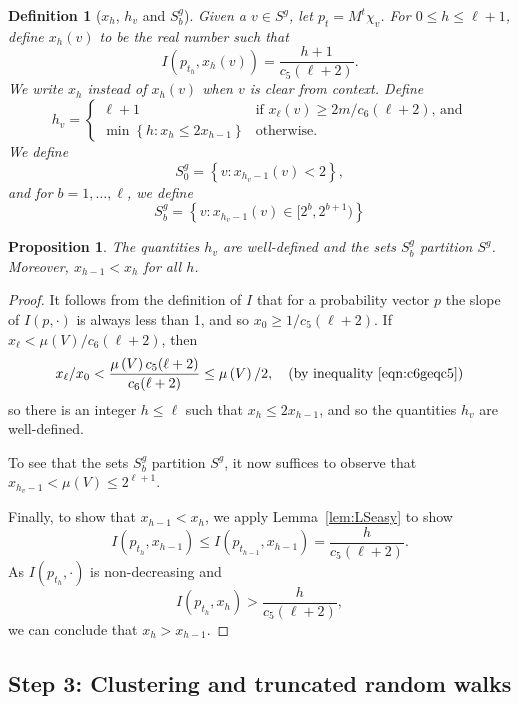 \documentclass[11pt]{article}
\newtheorem{proposition}[theorem]{Proposition}
\newtheorem{definition}[theorem]{Definition}
\def\setof#1{\left\{#1  \right\}}
\def\setof#1{\left\{#1  \right\}}
\def\vol#1{\mu \left(#1  \right)}
\begin{document}
\begin{definition}[$x_{h}$, $h_{v}$ and $S^{g}_{b}$]\label{def:Sgb}
Given a $v \in S^{g}$, let $p_{t} = M^{t} \chi_{v}$.
For $0 \leq h \leq \ell+1$,
  define $x_{h} (v)$ to be the real number such that
\[
  I (p_{t_{h}}, x_{h} (v)) = \frac{h+1}{c_{5} (\ell +2)}.
\]
We write $x_{h}$ instead of $x_{h} (v)$ when $v$ is clear from context.
Define
\[
h_{v} =
\begin{cases}
\ell+1  &  \text{if $x_{\ell} (v) \geq 2m / c_{6}(\ell +2)$, and}
\\
\min \setof{h : x_{h} \leq 2 x_{h-1}}  & \text{otherwise}.
\end{cases}
\]
We define
\[
  S^{g}_{0} = \setof{v : x_{h_{v}-1} (v) < 2},
\]
and for $b = 1, \dotsc , \ell$, we define
\[
  S^{g}_{b} = \setof{v : x_{h_{v}-1} (v) \in [2^{b}, 2^{b+1})}
\]
\end{definition}

\begin{proposition}\label{pro:Sgb}
The quantities $h_{v}$ are well-defined and
  the sets $S^{g}_{b}$ partition $S^{g}$.
Moreover, $x_{h-1} < x_{h}$ for all $h$.
\end{proposition}
\begin{proof}
It follows from the definition of
  $I$ that 
  for a probability vector $p$ the slope of $I (p, \cdot)$
  is always less than 1, and so
  $x_{0} \geq 1 / c_{5} (\ell +2)$.
If $x_{\ell} < \vol{V} / c_{6} (\ell +2)$,
  then 
\[
x_{\ell}/ x_{0} <
\frac{\vol{V} c_{5} (\ell + 2) }{c_{6} (\ell + 2)}
\leq 
 \vol{V}/2, \quad \text{(by inequality \eqref{eqn:c6geqc5})}
\]
  so there is an integer $h \leq \ell$ such that
  $x_{h} \leq 2 x_{h-1}$, and so the quantities $h_{v}$ are well-defined.

To see that the sets $S^{g}_{b}$ partition $S^{g}$, it now suffices to
  observe that $x_{h_{v}-1} < \vol{V} \leq 2^{\ell + 1}$.

Finally, to show that $x_{h-1} < x_{h}$,
  we apply Lemma~\ref{lem:LSeasy} to show
\[
  I (p_{t_{h}}, x_{h-1}) \leq 
  I (p_{t_{h-1}}, x_{h-1})
 = \frac{h}{c_{5} (\ell + 2)}.
\]
As $I (p_{t_{h}}, \cdot)$ is non-decreasing
  and
\[
I (p_{t_{h}}, x_{h}) > \frac{h}{c_{5} (\ell + 2)},
\]
we can conclude that $x_{h} > x_{h-1}$.
\end{proof}


\subsection*{Step 3: Clustering and truncated random walks}
\end{document}
